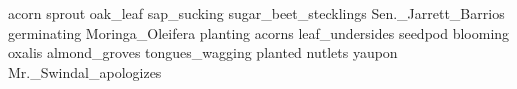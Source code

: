 acorn sprout oak\_leaf sap\_sucking sugar\_beet\_stecklings Sen.\_Jarrett\_Barrios germinating Moringa\_Oleifera planting acorns leaf\_undersides seedpod blooming oxalis almond\_groves tongues\_wagging planted nutlets yaupon Mr.\_Swindal\_apologizes 
